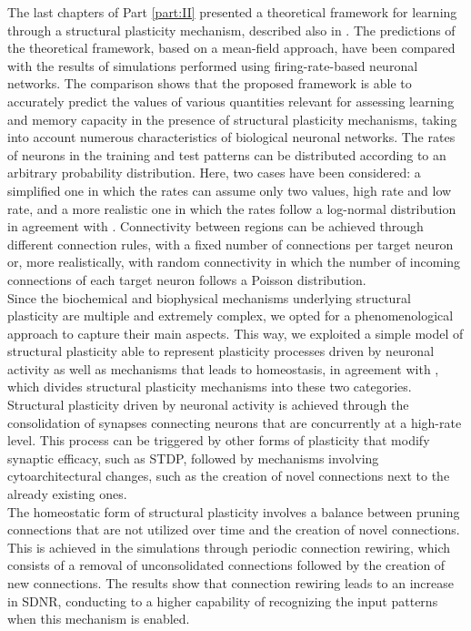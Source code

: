 \documentclass[a4paper, 12pt, twoside, openright]{book}
\begin{document}
The last chapters of Part \ref{part:II} presented a theoretical framework for learning through a structural plasticity mechanism, described also in \cite{Tiddia2023}. The predictions of the theoretical framework, based on a mean-field approach, have been compared with the results of simulations performed using firing-rate-based neuronal networks.
The comparison shows that the proposed framework is able to accurately predict the values of various quantities relevant for assessing learning and memory capacity in the presence of structural plasticity mechanisms, taking into account numerous characteristics of biological neuronal networks.
The rates of neurons in the training and test patterns can be distributed according to an arbitrary probability distribution. Here, two cases have been considered: a simplified one in which the rates can assume only two values, high rate and low rate, and a more realistic one in which the rates follow a log-normal distribution in agreement with \cite{Roxin2011}.
Connectivity between regions can be achieved through different connection rules, with a fixed number of connections per target neuron or, more realistically,
with random connectivity in which the number of incoming connections of each target neuron follows a Poisson distribution.\\
Since the biochemical and biophysical mechanisms underlying structural plasticity are multiple and extremely complex, we opted for a phenomenological approach to capture their main aspects. This way, we exploited a simple model of structural plasticity able to represent plasticity processes driven by neuronal activity as well as mechanisms that leads to homeostasis, in agreement with \cite{Fauth2016}, which divides structural plasticity mechanisms into these two categories.
Structural plasticity driven by neuronal activity is achieved through the consolidation of synapses connecting neurons that are concurrently at a high-rate level.
This process can be triggered by other forms of plasticity that modify synaptic efficacy, such as STDP, followed by 
mechanisms involving cytoarchitectural changes, such as the creation of novel connections next to the already existing ones.\\
The homeostatic form of structural plasticity involves a balance between pruning connections that are not utilized over time and the creation of novel connections.
This is achieved in the simulations through periodic connection rewiring, which consists of a removal of unconsolidated connections followed by the creation of new connections.
The results show that connection rewiring leads to an increase in SDNR, conducting to a higher capability of recognizing the input patterns when this mechanism is enabled.\\
\end{document}

